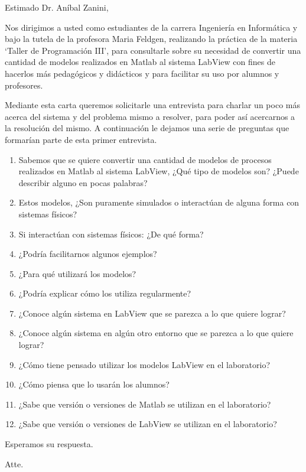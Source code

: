 \documentclass{letter}
\begin{document}
\begin{letter}{}

  \opening{Estimado Dr. Aníbal Zanini, }{}

  Nos dirigimos a usted como estudiantes de la carrera Ingeniería en
  Informática y bajo la tutela de la profesora Maria Feldgen,
  realizando la práctica de la materia `Taller de Programación III',
  para consultarle sobre su necesidad de convertir una cantidad de
  modelos realizados en Matlab al sistema LabView con fines de
  hacerlos más pedagógicos y didácticos y para facilitar su uso por
  alumnos y profesores.

  Mediante esta carta queremos solicitarle una entrevista para charlar
  un poco más acerca del sistema y del problema mismo a resolver, para
  poder así acercarnos a la resolución del mismo. A continuación le
  dejamos una serie de preguntas que formarían parte de esta primer
  entrevista.

  \begin{enumerate}
  \item Sabemos que se quiere convertir una cantidad de modelos de
    procesos realizados en Matlab al sistema LabView, ¿Qué tipo de
    modelos son? ¿Puede describir alguno en pocas palabras?
  \item Estos modelos, ¿Son puramente simulados o interactúan de
    alguna forma con sistemas físicos?
  \item Si interactúan con sistemas físicos: ¿De qué forma?
  \item ¿Podría facilitarnos algunos ejemplos?
  \item ¿Para qué utilizará los modelos?
  \item ¿Podría explicar cómo los utiliza regularmente?
  \item ¿Conoce algún sistema en LabView que se parezca a lo que
    quiere lograr?
  \item ¿Conoce algún sistema en algún otro entorno que se parezca a
    lo que quiere lograr?
  \item ¿Cómo tiene pensado utilizar los modelos LabView en el
    laboratorio?
  \item ¿Cómo piensa que lo usarán los alumnos?
  \item ¿Sabe que versión o versiones de Matlab se utilizan en el laboratorio?
  \item ¿Sabe que versión o versiones de LabView se utilizan en el laboratorio?
  \end{enumerate}

  Esperamos su respuesta.

\closing{Atte.}

\end{letter}
\end{document}
